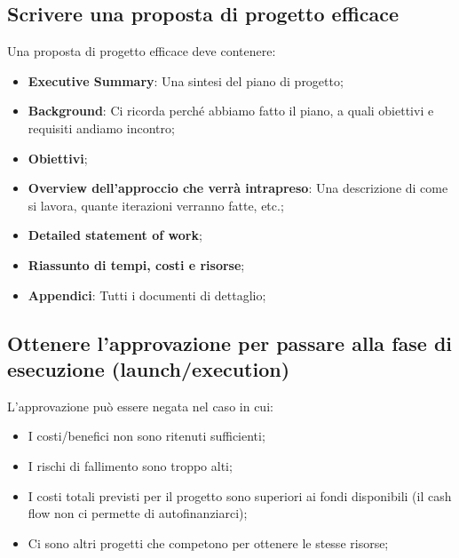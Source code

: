 \subsection{Scrivere una proposta di progetto efficace}
Una proposta di progetto efficace deve contenere:
\begin{itemize}
	\item \textbf{Executive Summary}: Una sintesi del piano di progetto;
	\item \textbf{Background}: Ci ricorda perché abbiamo fatto il piano, a quali obiettivi e requisiti andiamo incontro;
	\item \textbf{Obiettivi};
	\item \textbf{Overview dell'approccio che verrà intrapreso}: Una descrizione di come si lavora, quante iterazioni verranno fatte, etc.;
	\item \textbf{Detailed statement of work};
	\item \textbf{Riassunto di tempi, costi e risorse};
	\item \textbf{Appendici}: Tutti i documenti di dettaglio;
\end{itemize}
\subsection{Ottenere l’approvazione per passare alla fase di esecuzione (launch/execution)}
L'approvazione può essere negata nel caso in cui:
\begin{itemize}
	\item I costi/benefici non sono ritenuti sufficienti;
	\item I rischi di fallimento sono troppo alti;
	\item I costi totali previsti per il progetto sono superiori ai fondi disponibili (il cash flow non ci permette di autofinanziarci);
	\item Ci sono altri progetti che competono per ottenere le stesse risorse;
\end{itemize}
